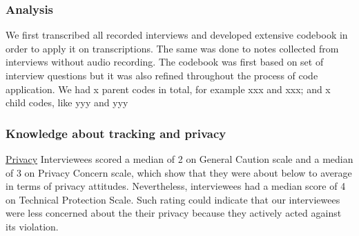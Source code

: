 \subsubsection{Analysis}
We first transcribed all recorded interviews and developed extensive codebook in order to apply it on transcriptions. The same was done to notes collected from interviews without audio recording. The codebook was first based on set of interview questions but it was also refined throughout the process of code application. We had x parent codes in total, for example xxx and xxx; and x child codes, like yyy and yyy
\subsubsection{Knowledge about tracking and privacy}
\label{sec:methods-tracking}

\underline{Privacy}
Interviewees scored a median of 2 on General Caution scale and a median of 3 on Privacy Concern scale, which show that they were about below to average in terms of privacy attitudes. Nevertheless, interviewees had a median score of 4 on Technical Protection Scale. Such rating could indicate that our interviewees were less concerned  about the their privacy because they actively acted against its violation. 

